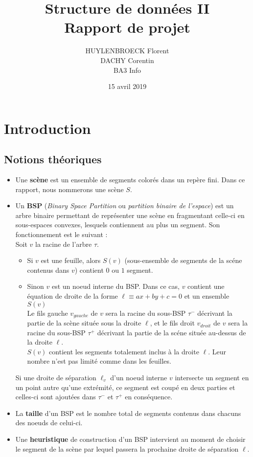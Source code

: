 \documentclass[11pts]{article}
\title{Structure de données II\\Rapport de projet}
\author{HUYLENBROECK Florent\\DACHY Corentin\\BA3 Info}
\date{15 avril 2019}
\begin{document}
\maketitle
\newpage
\tableofcontents
\newpage
\section{Introduction}
\subsection{Notions théoriques}
\begin{itemize}
\item Une \textbf{scène} est un ensemble de segments colorés dans un repère fini. Dans ce rapport, nous nommerons une scène $S$.
\item Un \textbf{BSP} (\emph{Binary Space Partition} ou \emph{partition binaire de l'espace}) est un arbre binaire permettant de représenter une scène en fragmentant celle-ci en sous-espaces convexes, lesquels contiennent au plus un segment.
Son fonctionnement est le suivant :\\[.2cm]
Soit $v$ la racine de l'arbre $\tau$.
\begin{itemize}
\item Si $v$ est une feuille, alors $S(v)$ (sous-ensemble de segments de la scéne contenus dans $v$) contient $0$ ou $1$ segment.
\item Sinon $v$ est un noeud interne du BSP. Dans ce cas, $v$ contient une équation de droite de la forme $\ell\equiv ax+by+c=0$ et un ensemble $S(v)$\\
Le fils gauche $v_{gauche}$ de $v$ sera la racine du sous-BSP $\tau^-$ décrivant la partie de la scène située sous la droite $\ell$, et le fils droit $v_{droit}$ de $v$ sera la racine du sous-BSP $\tau^+$ décrivant la partie de la scéne située au-dessus de la droite $\ell$.\\
$S(v)$ contient les segments totalement inclus à la droite $\ell$. Leur nombre n'est pas limité comme dans les feuilles.
\end{itemize}
Si une droite de séparation $\ell_v$ d'un noeud interne $v$ intersecte un segment en un point autre qu'une extrémité, ce segment est coupé en deux parties et celles-ci sont ajoutées dans $\tau^-$ et $\tau^+$ en conséquence.
\item La \textbf{taille} d'un BSP est le nombre total de segments contenus dans chacuns des noeuds de celui-ci.
\item Une \textbf{heuristique} de construction d'un BSP intervient au moment de choisir le segment de la scène par lequel passera la prochaine droite de séparation $\ell$.
\end{itemize}
\end{document}
